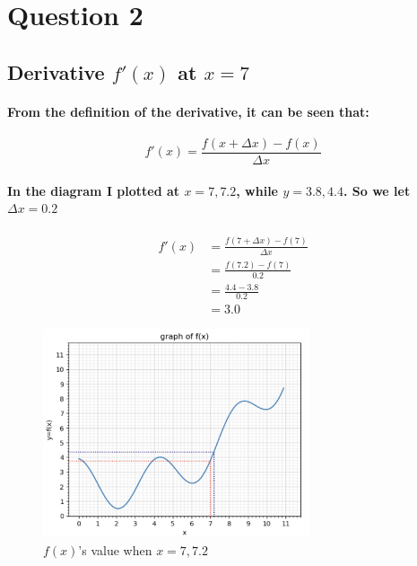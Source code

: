 \section{Question 2}
% 
% 
% 
\subsection{Derivative $f'(x)$ at $x = 7$}
% 
\paragraph{From the definition of the derivative, it can be seen that:}
% 
\begin{equation}
    f'(x)=\frac{f(x + \Delta x)-f(x)}{\Delta x}
\end{equation}
% 
% 
\paragraph{In the diagram I plotted at $x=7,7.2$, while $y=3.8,4.4$. So we let $\Delta x=0.2$}
% 
% 
% 
% 

\begin{align*}
    f'(x)
     & = \frac{f(7+\Delta x)-f(7)}{\Delta x} \\
     & = \frac{f(7.2)-f(7)}{0.2}             \\
     & = \frac{4.4-3.8}{0.2}                 \\
     & =3.0
\end{align*}

% 
% 
% 
% 
% 
\begin{figure}[H]
    \centering
    \includegraphics[width=0.7\textwidth]{pic/q2a.jpeg}
    \caption{$f(x)$'s value when $x=7,7.2$}
\end{figure}
% 
% 
% 
% 
% 
% 
% 
% 
% 
% 
% 
% 
% 
% 
% 
% 
% 
